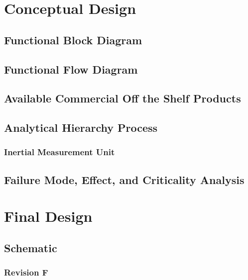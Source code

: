 \section{Conceptual Design} \label{sec:conceptual_design}

\subsection{Functional Block Diagram} \label{ssec:block_diagram}

\subsection{Functional Flow Diagram} \label{ssec:flow_diagram}

\subsection{Available Commercial Off the Shelf Products} \label{ssec:cots_products}

\subsection{Analytical Hierarchy Process} \label{ssec:ahp}

\subsubsection*{Inertial Measurement Unit} \label{sssec:ahp_imu}

\subsection{Failure Mode, Effect, and Criticality Analysis} \label{ssec:fmeca}

\section{Final Design} \label{sec:final_design}

\subsection{Schematic} \label{ssec:schematic}

\subsubsection{Revision F} \label{sssec:rev_f_sch}

